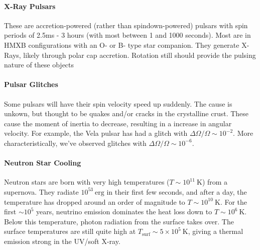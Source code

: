 \documentclass[10pt]{article}
\numberwithin{equation}{section}
\begin{document}
	\paragraph{X-Ray Pulsars} %
	\label{par:x_ray_pulsars}
	These are accretion-powered (rather than spindown-powered) pulsars with spin periods of 2.5ms - 3 hours (with most between 1 and 1000 seconds). Most are in HMXB configurations with an O- or B- type star companion. They generate X-Rays, likely through polar cap accretion. Rotation still should provide the pulsing nature of these objects
	\paragraph{Pulsar Glitches} %
	\label{par:pulsar_glitches}
	Some pulsars will have their spin velocity speed up suddenly. The cause is unkown, but thought to be quakes and/or cracks in the crystalline crust. These cause the moment of inertia to decrease, resulting in a increase in angular velocity. For example, the Vela pulsar has had a glitch with $\Delta \Omega/\Omega \sim 10^{-2}$. More characteristically, we've observed glitches with $\Delta\Omega/\Omega\sim 10^{-6}$.
	\paragraph{Neutron Star Cooling} %
	\label{par:neutron_star_cooling}
	Neutron stars are born with very high temperatures ($T\sim 10^{11}\ \mathrm{K}$) from a supernova. They radiate $10^{53}\ \mathrm{erg}$ in their first few seconds, and after a day, the temperature has dropped around an order of magnitude to $T\sim 10^{10}\ \mathrm{K}$. For the first $\sim 10^{5}$ years, neutrino emission dominates the heat loss down to $T\sim 10^6\ \mathrm{K}$. Below this temperature, photon radiation from the surface takes over. The surface temperatures are still quite high at $T_{\mathrm{surf}}\sim 5\times 10^{5}\ \mathrm{K}$, giving a thermal emission strong in the UV/soft X-ray.

\end{document}
